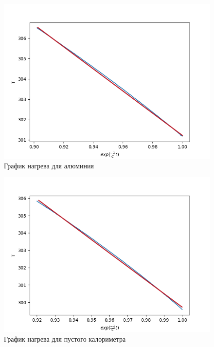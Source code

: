 \documentclass[a4paper]{article}
\begin{document}
\begin{figure}[h!]
    \includegraphics[scale=0.7]{lambda.png}
    \caption{График нагрева для алюминия}
\end{figure}

\begin{figure}[h!]
    \includegraphics[scale=0.7]{pustoy.png}
    \caption{График нагрева для пустого калориметра}
\end{figure}
\end{document}
